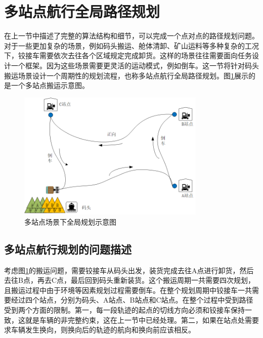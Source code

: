 \documentclass[master,academic]{ysuthesis} %
\begin{document}
	\section{多站点航行全局路径规划}
	在上一节中描述了完整的算法结构和细节，可以完成一个点对点的路径规划问题。对于一些更加复杂的场景，例如码头搬运、舱体清卸、矿山运料等多种复杂的工况下，铰接车需要依次去往各个区域规定完成卸货。这样的场景往往需要面向任务设计一个框架。因为这些场景需要更灵活的运动模式，例如倒车。这一节将针对码头搬运场景设计一个周期性的规划流程，也称多站点航行全局路径规划。图\ref{fig:全局规划}展示的是一个多站点搬运示意图。
	\begin{figure}[H]
		\centering
		\includegraphics[width=0.8\textwidth]{全局规划.png}
		\caption{多站点场景下全局规划示意图}
		\label{fig:全局规划}
	\end{figure}
		\subsection{多站点航行规划的问题描述}
		考虑图\ref{fig:全局规划}的搬运问题，需要铰接车从码头出发，装货完成去往A点进行卸货，然后去往B点，再去C点，最后回到码头重新装货。这个搬运周期一共需要四次规划，且搬运过程中由于环境等因素规划过程需要倒车。在整个规划周期中铰接车一共需要经过四个站点，分别为码头、A站点、B站点和C站点。在整个过程中受到路径受到两个方面的限制。第一，每一段轨迹的起点的切线方向必须和铰接车保持一致，这就是车辆的非完整约束，这在上一节中已经处理。第二，如果在站点处需要求车辆发生换向，则换向后的轨迹的航向和换向前应该相反。 
		
\end{document}
